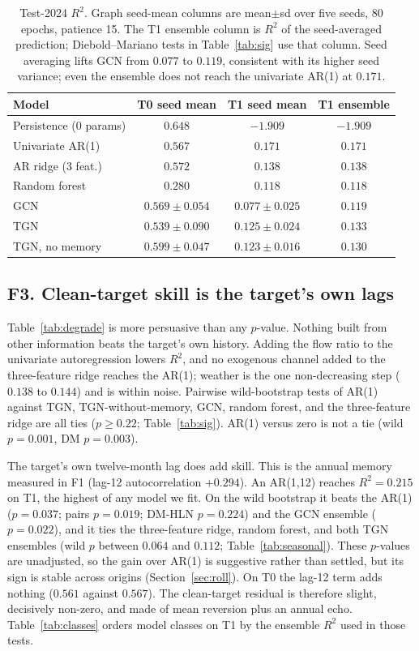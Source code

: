 \documentclass[10pt]{article}
\begin{document}
\begin{table}[t]
\centering
\caption{Test-2024 $R^2$. Graph seed-mean columns are mean$\pm$sd over five seeds, 80 epochs, patience 15. The T1 ensemble column is $R^2$ of the seed-averaged prediction; Diebold--Mariano tests in Table~\ref{tab:sig} use that column. Seed averaging lifts GCN from $0.077$ to $0.119$, consistent with its higher seed variance; even the ensemble does not reach the univariate AR(1) at $0.171$.}
\label{tab:ranks}
\footnotesize
\begin{tabular}{l ccc}
\toprule
\textbf{Model} & \textbf{T0 seed mean} & \textbf{T1 seed mean} & \textbf{T1 ensemble} \\
\midrule
Persistence (0 params) & $0.648$ & $-1.909$ & $-1.909$ \\
Univariate AR(1) & $0.567$ & $\mathbf{0.171}$ & $\mathbf{0.171}$ \\
AR ridge (3 feat.) & $0.572$ & $0.138$ & $0.138$ \\
Random forest & $0.280$ & $0.118$ & $0.118$ \\
GCN & $0.569\pm 0.054$ & $0.077\pm 0.025$ & $0.119$ \\
TGN & $0.539\pm 0.090$ & $0.125\pm 0.024$ & $0.133$ \\
TGN, no memory & $0.599\pm 0.047$ & $0.123\pm 0.016$ & $0.130$ \\
\bottomrule
\end{tabular}
\end{table}

\subsection{F3. Clean-target skill is the target's own lags}

Table~\ref{tab:degrade} is more persuasive than any $p$-value. Nothing built from other information beats the target's own history. Adding the flow ratio to the univariate autoregression lowers $R^2$, and no exogenous channel added to the three-feature ridge reaches the AR(1); weather is the one non-decreasing step ($0.138$ to $0.144$) and is within noise. Pairwise wild-bootstrap tests of AR(1) against TGN, TGN-without-memory, GCN, random forest, and the three-feature ridge are all ties ($p\ge 0.22$; Table~\ref{tab:sig}). AR(1) versus zero is not a tie (wild $p=0.001$, DM $p=0.003$).

The target's own twelve-month lag does add skill. This is the annual memory measured in F1 (lag-12 autocorrelation $+0.294$). An AR(1,12) reaches $R^2=0.215$ on T1, the highest of any model we fit. On the wild bootstrap it beats the AR(1) ($p=0.037$; pairs $p=0.019$; DM-HLN $p=0.224$) and the GCN ensemble ($p=0.022$), and it ties the three-feature ridge, random forest, and both TGN ensembles (wild $p$ between $0.064$ and $0.112$; Table~\ref{tab:seasonal}). These $p$-values are unadjusted, so the gain over AR(1) is suggestive rather than settled, but its sign is stable across origins (Section~\ref{sec:roll}). On T0 the lag-12 term adds nothing ($0.561$ against $0.567$). The clean-target residual is therefore slight, decisively non-zero, and made of mean reversion plus an annual echo. Table~\ref{tab:classes} orders model classes on T1 by the ensemble $R^2$ used in those tests.
\end{document}
